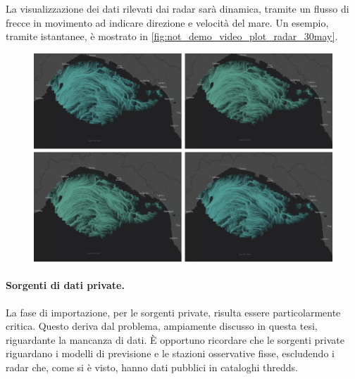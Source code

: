 \documentclass[./main.tex]{subfiles}
\begin{document}
La visualizzazione dei dati rilevati dai radar sarà dinamica, tramite un flusso di frecce in movimento ad indicare direzione e velocità del mare. Un esempio, tramite istantanee, è mostrato in \autoref{fig:not_demo_video_plot_radar_30may}.

\begin{figure}[!ht]
\noindent\begin{minipage}[c]{\textwidth}
\vspace{1cm}
\includegraphics[width=\textwidth]{images/not_demo_video_plot_radar_30may.pdf}
\captionsetup{font=small, hypcap=false}
\label{fig:not_demo_video_plot_radar_30may}
\end{minipage}
\hspace{0.05\textwidth}
\vspace{0.25cm}
\end{figure}


\paragraph{Sorgenti di dati private.}

La fase di importazione, per le sorgenti private, risulta essere particolarmente critica. Questo deriva dal problema, ampiamente discusso in questa tesi, riguardante la mancanza di dati. È opportuno ricordare che le sorgenti private riguardano i modelli di previsione e le stazioni osservative fisse, escludendo i radar che, come si è visto, hanno dati pubblici in cataloghi thredds. 
\end{document}
